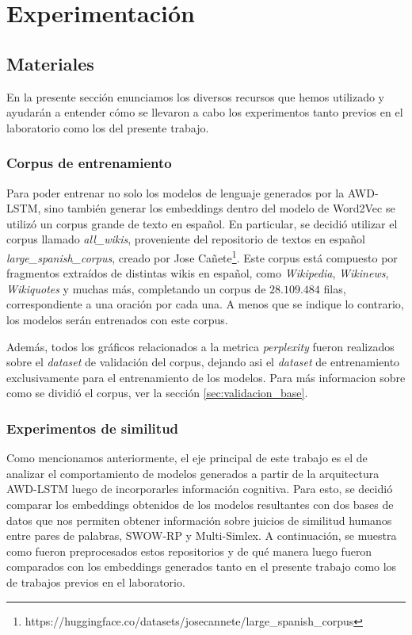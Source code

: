 \chapter{Experimentación}

\section{Materiales}

En la presente sección enunciamos los diversos recursos que hemos utilizado y ayudarán a entender cómo se llevaron a cabo los experimentos tanto previos en el laboratorio como los del presente trabajo.

\subsection{Corpus de entrenamiento}

Para poder entrenar no solo los modelos de lenguaje generados por la AWD-LSTM, 
sino también generar los embeddings dentro del modelo de Word2Vec se utilizó un 
corpus grande de texto en español. En particular, se decidió utilizar el corpus 
llamado \textit{all\_wikis}, proveniente del repositorio de textos en español 
\textit{large\_spanish\_corpus}, creado por Jose Cañete\footnote{https://huggingface.co/datasets/josecannete/large\_spanish\_corpus}.
Este corpus está compuesto por fragmentos extraídos de distintas wikis en español, 
como \textit{Wikipedia}, \textit{Wikinews}, \textit{Wikiquotes} y muchas más, completando un corpus de $28.109.484$ filas, 
correspondiente a una oración por cada una. A menos que se indique lo contrario, 
los modelos serán entrenados con este corpus.

Además, todos los gráficos relacionados a la metrica \textit{perplexity} fueron realizados sobre el \textit{dataset} de validación del corpus, dejando asi el \textit{dataset} de entrenamiento exclusivamente para el entrenamiento de los modelos. Para más informacion sobre como se dividió el corpus, ver la sección \ref{sec:validacion_base}.


\subsection{Experimentos de similitud}

Como mencionamos anteriormente, el eje principal de este trabajo es el de analizar el 
comportamiento de modelos generados a partir de la arquitectura AWD-LSTM luego de incorporarles 
información cognitiva. Para esto, se decidió comparar los embeddings obtenidos de los modelos 
resultantes con dos bases de datos que nos permiten obtener información sobre juicios de similitud 
humanos entre pares de palabras, SWOW-RP y Multi-Simlex. A continuación, se muestra como fueron 
preprocesados estos repositorios y de qué manera luego fueron comparados con los embeddings 
generados tanto en el presente trabajo como los de trabajos previos en el laboratorio.

